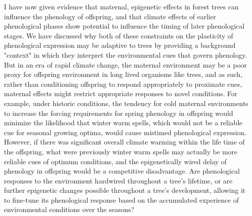 \documentclass{article}\usepackage[]{graphicx}\usepackage[]{color}
\begin{document}
\par I have now given evidence that maternal, epigenetic effects in forest trees can influence the phenology of offspring, and that climate effects of earlier phenological phases show potential to influence the timing of later phenological stages. We have discussed why both of these constraints on the plasticity of phenological expression may be adaptive to trees by providing a background "context" in which they interpret the environmental cues that govern phenology. But in an era of rapid climate change, the maternal environment may be a poor proxy for offspring environment in long lived organisms like trees, and as such, rather than conditioning offspring to respond appropriately to proximate cues, maternal effects might restrict appropriate responses to novel conditions. For example, under historic conditions, the tendency for cold maternal environments to increase the forcing requirements for spring phenology in offspring would minimize the likelihood that winter warm spells, which would not be a reliable cue for seasonal growing optima, would cause mistimed phenological expression. However, if there was significant overall climate warming within the life time of the offspring, what were previously winter warm spells may actually be more reliable cues of optimum conditions, and the epigenetically wired delay of phenology in offspring would be a competitive disadvantage. Are phenological responses to the environment hardwired throughout a tree's lifetime, or are further epigenetic changes possible throughout a tree's development, allowing it to fine-tune its phenological response based on the accumulated experience of environmental conditions over the seasons?  
\end{document}
